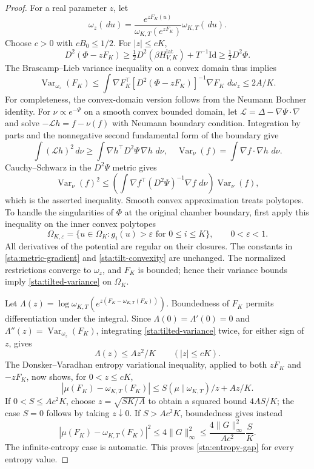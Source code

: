 \documentclass[11pt,reqno]{amsart}
\numberwithin{equation}{section}
\theoremstyle{definition}
\newcommand{\1}{\mathbf 1}
\newcommand{\dd}{\,d}
\DeclareMathOperator{\Var}{Var}
\begin{document}
\begin{proof}
For a real parameter $z$, let
\[
\omega_z(\dd u)=
 \frac{e^{zF_K(u)}}{\omega_{K,T}(e^{zF_K})}\omega_{K,T}(\dd u).
\]
Choose $c>0$ with $cB_0\le1/2$. For $|z|\le cK$,
\begin{equation}\label{sta:tilt-convexity}
D^2(\Phi-zF_K)
\ge\tfrac12D^2(\beta H^{\mathrm{lat}}_{V,K})
   +T^{-1}\mathrm{Id}
\ge\tfrac12D^2\Phi.
\end{equation}
The Brascamp--Lieb variance inequality on a convex domain thus implies
\begin{equation}\label{sta:tilted-variance}
\Var_{\omega_z}(F_K)
\le\int\nabla F_K^\top[D^2(\Phi-zF_K)]^{-1}\nabla F_K\,\dd\omega_z
\le 2A/K.
\end{equation}
For completeness, the convex-domain version follows from the Neumann
Bochner identity. For $\nu\propto e^{-\Psi}$ on a smooth convex bounded
domain, let $\mathcal L=\Delta-\nabla\Psi\cdot\nabla$ and solve
$-\mathcal Lh=f-\nu(f)$ with Neumann boundary condition. Integration
by parts and the nonnegative second fundamental form of the boundary
give
\[
\int(\mathcal Lh)^2\dd\nu
\ge\int\nabla h^\top D^2\Psi\,\nabla h\,\dd\nu,
\quad
\Var_\nu(f)=\int\nabla f\cdot\nabla h\,\dd\nu.
\]
Cauchy--Schwarz in the $D^2\Psi$ metric gives
\[
\Var_\nu(f)^2\le
 \left(\int\nabla f^\top(D^2\Psi)^{-1}\nabla f\,\dd\nu\right)
 \Var_\nu(f),
\]
which is the asserted inequality. Smooth convex approximation treats
polytopes. To handle the singularities of $\Phi$ at the original
chamber boundary, first apply this inequality on the inner convex
polytopes
\[
\Omega_{K,\varepsilon}
 =\{u\in\Omega_K:g_i(u)>\varepsilon\text{ for }0\le i\le K\},
\qquad 0<\varepsilon<1.
\]
All derivatives of the potential are regular on their closures. The
constants in \eqref{sta:metric-gradient} and
\eqref{sta:tilt-convexity} are unchanged. The normalized restrictions
converge to $\omega_z$, and $F_K$ is bounded; hence their variance
bounds imply \eqref{sta:tilted-variance} on $\Omega_K$.

Let
$\Lambda(z)=\log\omega_{K,T}
(e^{z(F_K-\omega_{K,T}(F_K))})$.
Boundedness of $F_K$ permits differentiation under the integral.
Since $\Lambda(0)=\Lambda'(0)=0$ and
$\Lambda''(z)=\Var_{\omega_z}(F_K)$, integrating
\eqref{sta:tilted-variance} twice, for either sign of $z$, gives
\begin{equation}\label{sta:mgf}
\Lambda(z)\le A z^2/K\qquad(|z|\le cK).
\end{equation}
The Donsker--Varadhan entropy variational inequality, applied to both $zF_K$ and
$-zF_K$, now shows, for $0<z\le cK$,
\begin{equation}\label{sta:entropy-optimization}
|\mu(F_K)-\omega_{K,T}(F_K)|
\le S(\mu\mid\omega_{K,T})/z+Az/K.
\end{equation}
If $0<S\le Ac^2K$, choose $z=\sqrt{SK/A}$ to obtain a squared bound
$4AS/K$; the case $S=0$ follows by taking $z\downarrow0$.
If $S>Ac^2K$, boundedness gives instead
\[
|\mu(F_K)-\omega_{K,T}(F_K)|^2
\le4\|G\|_\infty^2
\le \frac{4\|G\|_\infty^2}{Ac^2}\frac SK.
\]
The infinite-entropy case is automatic. This proves
\eqref{sta:entropy-gap} for every entropy value.


\end{proof}
\end{document}

